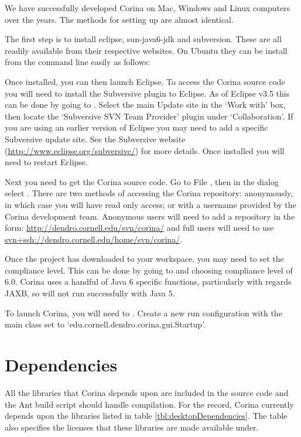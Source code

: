 We have successfully developed Corina on Mac, Windows and Linux computers over the years.  The methods for setting up are almost identical.  

The first step is to install eclipse, sun-java6-jdk and subversion.  These are all readily available from their respective websites.  On Ubuntu they can be install from the command line easily as follows:


Once installed, you can then launch Eclipse.  To access the Corina source code you will need to install the Subversive plugin to Eclipse.  As of Eclipse v3.5 this can be done by going to .  Select the main Update site in the `Work with' box, then locate the `Subversive SVN Team Provider' plugin under `Collaboration'.  If you are using an earlier version of Eclipse you may need to add a specific Subversive update site.  See the Subversive website (\url{http://www.eclipse.org/subversive/}) for more details.  Once installed you will need to restart Eclipse.

Next you need to get the Corina source code.  Go to File , then in the dialog select .  There are two methods of accessing the Corina repository: anonymously, in which case you will have read only access; or with a username provided by the Corina development team.  Anonymous users will need to add a repository in the form: \url{http://dendro.cornell.edu/svn/corina/} and full users will need to use \url{svn+ssh://dendro.cornell.edu/home/svn/corina/}.

Once the project has downloaded to your workspace, you may need to set the compliance level.  This can be done by going to  and choosing compliance level of 6.0.  Corina uses a handful of Java 6 specific functions, particularly with regards JAXB, so will not run successfully with Java 5.

To launch Corina, you will need to .  Create a new run configuration with the main class set to `edu.cornell.dendro.corina.gui.Startup'.     


\section{Dependencies}

All the libraries that Corina depends upon are included in the source code and the Ant build script should handle compilation.  For the record, Corina currently depends upon the libraries listed in table \ref{tbl:desktopDependencies}.  The table also specifies the licenses that these libraries are made available under.


